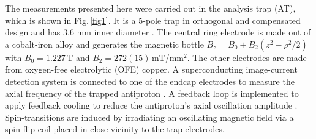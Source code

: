 \documentclass[12pt,preprint%
]{elsarticle}
\begin{document}
The measurements presented here were carried out in the analysis trap (AT), which is shown in Fig.$\,$\ref{fig1}. It is a 5-pole trap in orthogonal and compensated design and has 3.6 mm inner diameter \cite{CCRodegheri2012}. The central ring electrode is made out of a cobalt-iron alloy and generates the magnetic bottle $B_z=B_0 + B_2 (z^2-\rho^2/2)$ with $B_0=1.227\,$T and $B_2 = 272(15)\,$mT/mm$^2$. The other electrodes are made from oxygen-free electrolytic (OFE) copper. A superconducting image-current detection system is connected to one of the endcap electrodes to measure the axial frequency of the trapped antiproton \cite{Wine,Ulm,HiroRSI2016}. A feedback loop is implemented to apply feedback cooling to reduce the antiproton's axial oscillation amplitude \cite{DUrso2003}. Spin-transitions are induced by irradiating an oscillating magnetic field via a spin-flip coil placed in close vicinity to the trap electrodes. 
\end{document}
